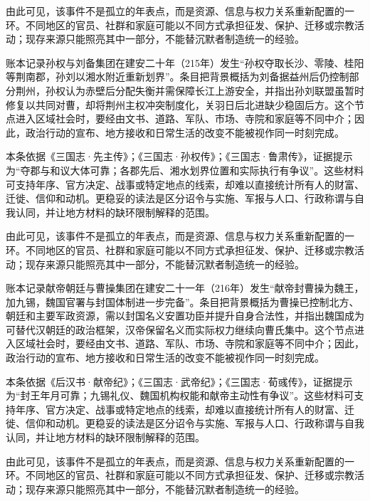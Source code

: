 由此可见，该事件不是孤立的年表点，而是资源、信息与权力关系重新配置的一环。不同地区的官员、社群和家庭可能以不同方式承担征发、保护、迁移或宗教活动；现存来源只能照亮其中一部分，不能替沉默者制造统一的经验。

账本记录孙权与刘备集团在建安二十年（215年）发生“孙权夺取长沙、零陵、桂阳等荆南郡，孙刘以湘水附近重新划界”。条目把背景概括为刘备据益州后仍控制部分荆州，孙权认为赤壁后分配失衡并需保障长江上游安全，并指出孙刘联盟虽暂时修复以共同对曹，却将荆州主权冲突制度化，关羽日后北进缺少稳固后方。这个节点进入区域社会时，要经由文书、道路、军队、市场、寺院和家庭等不同中介；因此，政治行动的宣布、地方接收和日常生活的改变不能被视作同一时刻完成。

本条依据《三国志·先主传》；《三国志·孙权传》；《三国志·鲁肃传》，证据提示为“夺郡与和议大体可靠；各郡先后、湘水划界位置和实际执行有争议”。这些材料可支持年序、官方决定、战事或特定地点的线索，却难以直接统计所有人的财富、迁徙、信仰和动机。更稳妥的读法是区分诏令与实施、军报与人口、行政称谓与自我认同，并让地方材料的缺环限制解释的范围。

由此可见，该事件不是孤立的年表点，而是资源、信息与权力关系重新配置的一环。不同地区的官员、社群和家庭可能以不同方式承担征发、保护、迁移或宗教活动；现存来源只能照亮其中一部分，不能替沉默者制造统一的经验。

账本记录献帝朝廷与曹操集团在建安二十一年（216年）发生“献帝封曹操为魏王，加九锡，魏国官署与封国体制进一步完备”。条目把背景概括为曹操已控制北方、朝廷和主要军政资源，需以封国名义安置功臣并提升自身合法性，并指出魏国成为可替代汉朝廷的政治框架，汉帝保留名义而实际权力继续向曹氏集中。这个节点进入区域社会时，要经由文书、道路、军队、市场、寺院和家庭等不同中介；因此，政治行动的宣布、地方接收和日常生活的改变不能被视作同一时刻完成。

本条依据《后汉书·献帝纪》；《三国志·武帝纪》；《三国志·荀彧传》，证据提示为“封王年月可靠；九锡礼仪、魏国机构权能和献帝主动性有争议”。这些材料可支持年序、官方决定、战事或特定地点的线索，却难以直接统计所有人的财富、迁徙、信仰和动机。更稳妥的读法是区分诏令与实施、军报与人口、行政称谓与自我认同，并让地方材料的缺环限制解释的范围。

由此可见，该事件不是孤立的年表点，而是资源、信息与权力关系重新配置的一环。不同地区的官员、社群和家庭可能以不同方式承担征发、保护、迁移或宗教活动；现存来源只能照亮其中一部分，不能替沉默者制造统一的经验。

